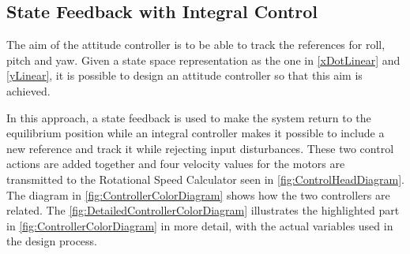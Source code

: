 \subsection{State Feedback with Integral Control}
The aim of the attitude controller is to be able to track the references for roll, pitch and yaw. Given a state space representation as the one in \autoref{xDotLinear} and \ref{yLinear}, it is possible to design an attitude controller so that this aim is achieved. %

In this approach, a state feedback is used to make the system return to the equilibrium position while an integral controller makes it possible to include a new reference and track it while rejecting input disturbances. These two control actions are added together and four velocity values for the motors are transmitted to the Rotational Speed Calculator seen in \autoref{fig:ControlHeadDiagram}. The diagram in \autoref{fig:ControllerColorDiagram} shows how the two controllers are related. The \autoref{fig:DetailedControllerColorDiagram} illustrates the highlighted part in \autoref{fig:ControllerColorDiagram} in more detail, with the actual variables used in the design process.
%
